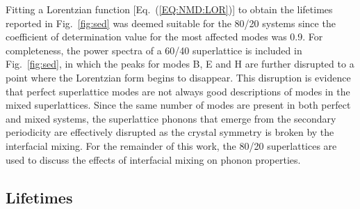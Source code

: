 \documentclass[aps,prb,preprint,preprintnumbers,amsmath,amssymb,floatfix,superscriptaddress]{revtex4}
\begin{document}
Fitting a Lorentzian function [Eq.~(\ref{EQ:NMD:LOR})] to obtain the lifetimes reported in Fig.~\ref{fig:sed} was deemed suitable for the 80/20 systems since the coefficient of determination value \cite{Cowpe20081066} for the most affected modes was 0.9. For completeness, the power spectra of a 60/40 superlattice is included in Fig.~\ref{fig:sed}, in which the peaks for modes B, E and H are further disrupted to a point where the Lorentzian form begins to disappear. This disruption is evidence that perfect superlattice modes are not always good descriptions of modes in the mixed superlattices. Since the same number of modes are present in both perfect and mixed systems, the superlattice phonons that emerge from the secondary periodicity are effectively disrupted as the crystal symmetry is broken by the interfacial mixing. For the remainder of this work, the 80/20 superlattices are used to discuss the effects of interfacial mixing on phonon properties.
\renewcommand{\topfraction}{1.0}
\begin{figure*}%
\begin{center}
\renewcommand{\figure}{Fig.}
\caption{Power spectra for selected modes of the $4\times 4$ perfect and mixed superlattices [indicated by the labeled gray square markers in Figs.~\ref{fig:dispersion}(a)-\ref{fig:dispersion}(c)]. Dark blue corresponds to a perfect superlattice, red corresponds to mixing of 80/20, and light blue corresponds to mixing of 60/40. Reported lifetimes calculated from the fitting of the Lorentzian functions (not shown) are also included. By removing a single MD seed, the average uncertainty in the fitting was determined to be 7.5\%.}
\label{fig:sed}
\end{center}
\end{figure*}

\subsection{Lifetimes}
\end{document}
